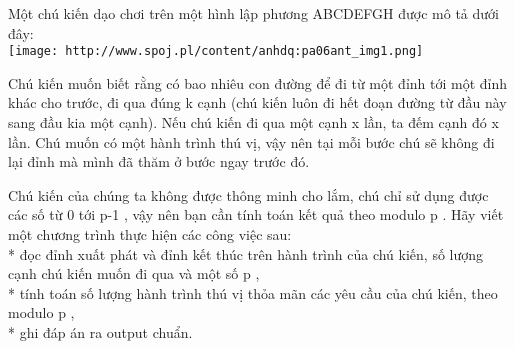 Một chú kiến dạo chơi trên một hình lập phương ABCDEFGH được mô tả dưới đây:   
\\
\texttt{[image: http://www.spoj.pl/content/anhdq:pa06ant\_img1.png]}



   Chú kiến muốn biết rằng có bao nhiêu con đường để đi từ một đỉnh tới một đỉnh khác cho trước, đi qua đúng       k      cạnh (chú kiến luôn đi hết đoạn đường từ đầu này sang đầu kia một cạnh). Nếu chú kiến đi qua một cạnh       x      lần, ta đếm cạnh đó       x      lần. Chú muốn có một hành trình thú vị, vậy nên tại mỗi bước chú sẽ không đi lại đỉnh mà mình đã thăm ở bước ngay trước đó.  

   Chú kiến của chúng ta không được thông minh cho lắm, chú chỉ sử dụng được các số từ       0      tới       p-1      , vậy nên bạn cần tính toán kết quả theo modulo       p      .
Hãy viết một chương trình thực hiện các công việc sau:   
\\   * đọc đỉnh xuất phát và đỉnh kết thúc trên hành trình của chú kiến, số lượng cạnh chú kiến muốn đi qua và một số       p      ,   
\\   * tính toán số lượng hành trình thú vị thỏa mãn các yêu cầu của chú kiến, theo modulo       p      ,   
\\   * ghi đáp án ra output chuẩn.